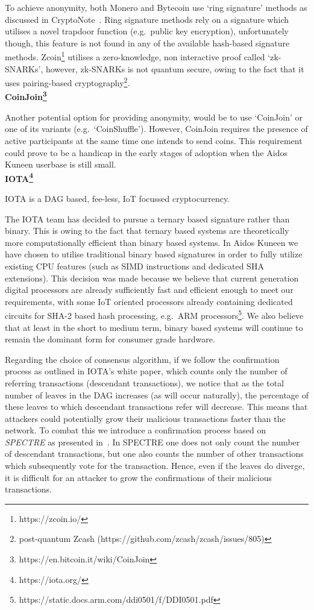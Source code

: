 \documentclass[a4paper,10pt,twocolumn]{article}
\begin{document}
To achieve anonymity, both Monero and Bytecoin use `ring signature' methods as discussed in CryptoNote~\cite{ringsig}.
Ring signature methods rely on a signature which utilises a novel trapdoor function (e.g.\ public key encryption), unfortunately though, this feature is 
not found in any of the available hash-based signature methods. Zcoin\footnote{https://zcoin.io/} utilises a zero-knowledge, non interactive proof called `zk-SNARKs', however, zk-SNARKs is not quantum secure, owing to the fact that it uses pairing-based 
cryptography\footnote{post-quantum Zcash (https://github.com/zcash/zcash/issues/805)}. 
\\

\noindent
{\bf CoinJoin\footnote{https://en.bitcoin.it/wiki/CoinJoin}}

Another potential option for providing anonymity, would be to use `CoinJoin' or one of its variants (e.g.\ `CoinShuffle'). However, 
CoinJoin requires the presence of active participants at the same time one intends to send coins. This requirement could prove to be a 
handicap in the early stages of adoption when the Aidos Kuneen userbase is still small. 
\\

\noindent
{\bf IOTA\footnote{https://iota.org/}}

IOTA is a DAG based, fee-less, IoT focussed cryptocurrency.

The IOTA team has decided to pursue a ternary based signature rather than binary. This is owing to the fact that ternary based 
systems are theoretically more computationally efficient than binary based systems. In Aidos Kuneen we have chosen to utilise 
traditional binary based signatures in order to fully utilize existing CPU features (such as SIMD instructions and dedicated SHA 
extensions). This decision was made because we believe that current generation digital processors are already sufficiently fast and 
efficient enough to meet our requirements, with some IoT oriented processors already containing dedicated circuits for 
SHA-2 based hash processing, e.g.~ARM processors\footnote{https://static.docs.arm.com/ddi0501/f/DDI0501.pdf}. We also believe that at 
least in the short to medium term, binary based systems will continue to remain the dominant form for consumer grade hardware.

Regarding the choice of consensus algorithm, if we follow the confirmation process as outlined in IOTA's white paper, which counts only the number of referring transactions 
(descendant transactions), we notice that as the total number of leaves in the DAG increases (as will occur naturally), 
the percentage of these leaves to which descendant transactions refer will decrease.
This means that attackers could potentially grow their malicious
transactions faster than the network. To combat this we introduce a confirmation process based on \emph{SPECTRE} as presented 
in~\cite{spectre}. In SPECTRE one does not only count the number of descendant transactions, but one also counts the number of other 
transactions which subsequently vote for the transaction. Hence, even if the leaves do diverge, it is difficult for an attacker to grow 
the confirmations of their malicious transactions.
\end{document}
